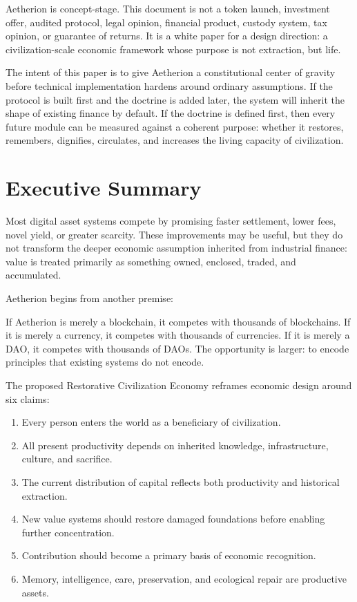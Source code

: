 \documentclass[12pt]{article}
\begin{document}
Aetherion is concept-stage. This document is not a token launch, investment offer, audited protocol, legal opinion, financial product, custody system, tax opinion, or guarantee of returns. It is a white paper for a design direction: a civilization-scale economic framework whose purpose is not extraction, but life.

The intent of this paper is to give Aetherion a constitutional center of gravity before technical implementation hardens around ordinary assumptions. If the protocol is built first and the doctrine is added later, the system will inherit the shape of existing finance by default. If the doctrine is defined first, then every future module can be measured against a coherent purpose: whether it restores, remembers, dignifies, circulates, and increases the living capacity of civilization.

\section{Executive Summary}

Most digital asset systems compete by promising faster settlement, lower fees, novel yield, or greater scarcity. These improvements may be useful, but they do not transform the deeper economic assumption inherited from industrial finance: value is treated primarily as something owned, enclosed, traded, and accumulated.

Aetherion begins from another premise:


If Aetherion is merely a blockchain, it competes with thousands of blockchains. If it is merely a currency, it competes with thousands of currencies. If it is merely a DAO, it competes with thousands of DAOs. The opportunity is larger: to encode principles that existing systems do not encode.

The proposed Restorative Civilization Economy reframes economic design around six claims:

\begin{enumerate}
  \item Every person enters the world as a beneficiary of civilization.
  \item All present productivity depends on inherited knowledge, infrastructure, culture, and sacrifice.
  \item The current distribution of capital reflects both productivity and historical extraction.
  \item New value systems should restore damaged foundations before enabling further concentration.
  \item Contribution should become a primary basis of economic recognition.
  \item Memory, intelligence, care, preservation, and ecological repair are productive assets.
\end{enumerate}
\end{document}
